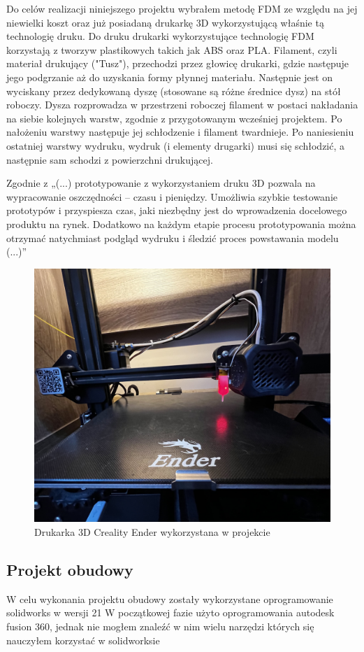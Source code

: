 \documentclass[a4paper,12pt,reqno]{article}
\begin{document}
Do celów realizacji niniejszego projektu wybrałem metodę FDM ze względu na jej niewielki koszt oraz już posiadaną drukarkę 3D wykorzystującą właśnie tą technologię druku. 
Do druku drukarki wykorzystujące technologię FDM korzystają z tworzyw plastikowych takich jak ABS oraz PLA.
Filament, czyli materiał drukujący ("Tusz"), przechodzi przez głowicę drukarki, gdzie następuje jego podgrzanie aż do uzyskania formy płynnej materiału. 
Następnie jest on wyciskany przez dedykowaną dyszę (stosowane są różne średnice dysz) na stół roboczy. 
Dysza rozprowadza w przestrzeni roboczej filament w postaci nakładania na siebie kolejnych warstw, zgodnie z przygotowanym wcześniej projektem. 
Po nałożeniu warstwy następuje jej schłodzenie i filament twardnieje. 
Po naniesieniu ostatniej warstwy wydruku, wydruk (i elementy drugarki) musi się schłodzić, a następnie sam schodzi z powierzchni drukującej.

Zgodnie z \cite{prototyp3dzalety} „(...) prototypowanie z wykorzystaniem druku 3D pozwala na wypracowanie oszczędności – czasu i pieniędzy. Umożliwia szybkie testowanie prototypów i przyspiesza czas, jaki niezbędny jest do wprowadzenia docelowego produktu na rynek. Dodatkowo na każdym etapie procesu prototypowania można otrzymać natychmiast podgląd wydruku i śledzić proces powstawania modelu (...)”

\begin{figure}[H]%
\centering
\includegraphics[width=0.8\columnwidth]{imgs/ender3v2.jpg}
\caption{Drukarka 3D Creality Ender wykorzystana w projekcie \label{ender3d}}
\quad
\end{figure}

\subsection{Projekt obudowy}
W celu wykonania projektu obudowy zostały wykorzystane oprogramowanie solidworks	 w wersji 21
W początkowej fazie użyto oprogramowania autodesk fusion 360, jednak nie mogłem znaleźć w nim wielu narzędzi których się nauczyłem korzystać w solidworksie
\end{document}
